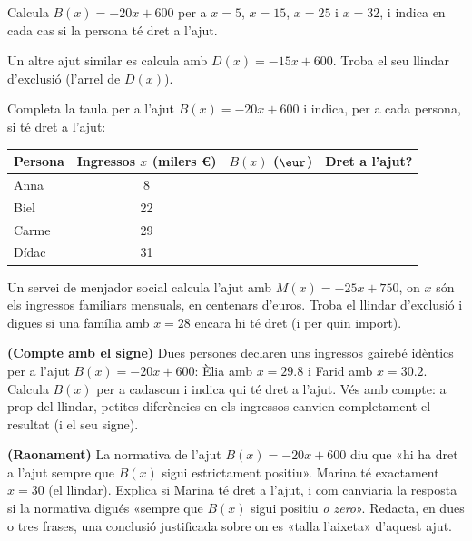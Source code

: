 \begin{exercicis}
\begin{exlist}
  \item Calcula $B(x)=-20x+600$ per a $x=5$, $x=15$, $x=25$ i $x=32$, i
        indica en cada cas si la persona té dret a l'ajut.

  \item Un altre ajut similar es calcula amb $D(x)=-15x+600$. Troba el seu
        llindar d'exclusió (l'arrel de $D(x)$).

  \item Completa la taula per a l'ajut $B(x)=-20x+600$ i indica, per a
        cada persona, si té dret a l'ajut:
    \begin{center}
    \begin{tabular}{lccc}
    \toprule
    Persona & Ingressos $x$ (milers €) & $B(x)$ ($\eur$) & Dret a l'ajut? \\
    \midrule
    Anna   & 8  & & \\
    Biel   & 22 & & \\
    Carme  & 29 & & \\
    Dídac  & 31 & & \\
    \bottomrule
    \end{tabular}
    \end{center}

  \item Un servei de menjador social calcula l'ajut amb $M(x)=-25x+750$, on
        $x$ són els ingressos familiars mensuals, en centenars d'euros.
        Troba el llindar d'exclusió i digues si una família amb $x=28$
        encara hi té dret (i per quin import).

  \item \textbf{(Compte amb el signe)} Dues persones declaren uns ingressos
        gairebé idèntics per a l'ajut $B(x)=-20x+600$: Èlia amb
        $x=\num{29,8}$ i Farid amb $x=\num{30,2}$. Calcula $B(x)$ per a
        cadascun i indica qui té dret a l'ajut. Vés amb compte: a prop del
        llindar, petites diferències en els ingressos canvien completament
        el resultat (i el seu signe).

  \item \textbf{(Raonament)} La normativa de l'ajut $B(x)=-20x+600$ diu que
        «hi ha dret a l'ajut sempre que $B(x)$ sigui estrictament
        positiu». Marina té exactament $x=30$ (el llindar). Explica si
        Marina té dret a l'ajut, i com canviaria la resposta si la
        normativa digués «sempre que $B(x)$ sigui positiu \emph{o zero}».
        Redacta, en dues o tres frases, una conclusió justificada sobre on
        es «talla l'aixeta» d'aquest ajut.
\end{exlist}
\end{exercicis}

